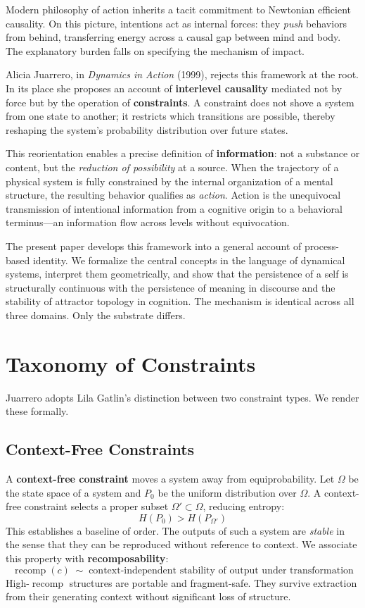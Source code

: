 \documentclass[11pt]{article}
\newcommand{\recomp}{\operatorname{recomp}}
\begin{document}
Modern philosophy of action inherits a tacit commitment to Newtonian efficient causality.
On this picture, intentions act as internal forces: they \emph{push} behaviors from
behind, transferring energy across a causal gap between mind and body. The explanatory
burden falls on specifying the mechanism of impact.

Alicia Juarrero, in \textit{Dynamics in Action} (1999), rejects this framework at the root.
In its place she proposes an account of \textbf{interlevel causality} mediated not by
force but by the operation of \textbf{constraints}. A constraint does not shove a system
from one state to another; it restricts which transitions are possible, thereby reshaping
the system's probability distribution over future states.

This reorientation enables a precise definition of \textbf{information}: not a substance
or content, but the \emph{reduction of possibility} at a source. When the trajectory of a
physical system is fully constrained by the internal organization of a mental structure,
the resulting behavior qualifies as \emph{action}. Action is the unequivocal transmission
of intentional information from a cognitive origin to a behavioral terminus---an information
flow across levels without equivocation.

The present paper develops this framework into a general account of process-based identity.
We formalize the central concepts in the language of dynamical systems, interpret them
geometrically, and show that the persistence of a self is structurally continuous with the
persistence of meaning in discourse and the stability of attractor topology in cognition.
The mechanism is identical across all three domains. Only the substrate differs.

\section{Taxonomy of Constraints}

Juarrero adopts Lila Gatlin's distinction between two constraint types. We render these
formally.

\subsection{Context-Free Constraints}

A \textbf{context-free constraint} moves a system away from equiprobability. Let $\Omega$
be the state space of a system and $P_0$ be the uniform distribution over $\Omega$.
A context-free constraint selects a proper subset $\Omega' \subset \Omega$, reducing
entropy:
\[
H(P_0) > H(P_{\Omega'})
\]
This establishes a baseline of order. The outputs of such a system are \emph{stable} in
the sense that they can be reproduced without reference to context. We associate this
property with \textbf{recomposability}:
\[
\recomp(c) \;\sim\; \text{context-independent stability of output under transformation}
\]
High-$\recomp$ structures are portable and fragment-safe. They survive extraction from
their generating context without significant loss of structure.
\end{document}
